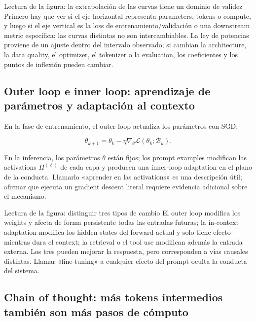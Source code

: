 \begin{warningbox}{Lectura de la figura: la extrapolación de las curvas tiene un dominio de validez}
Primero hay que ver si el eje horizontal representa parameters, tokens o compute, y luego si el eje vertical es la loss de entrenamiento/validación o una downstream metric específica; las curvas distintas no son intercambiables. La ley de potencias proviene de un ajuste dentro del intervalo observado; si cambian la architecture, la data quality, el optimizer, el tokenizer o la evaluation, los coeficientes y los puntos de inflexión pueden cambiar.
\end{warningbox}

\subsection{Outer loop e inner loop: aprendizaje de parámetros y adaptación al contexto}

En la fase de entrenamiento, el outer loop actualiza los parámetros con SGD:

\[
\theta_{k+1}=\theta_k-\eta\nabla_\theta \mathcal L(\theta_k;\mathcal B_k).
\]

En la inferencia, los parámetros $\theta$ están fijos; los prompt examples modifican las activations $H^{(\ell)}$ de cada capa y producen una inner-loop adaptation en el plano de la conducta. Llamarlo «aprender en las activations» es una descripción útil; afirmar que ejecuta un gradient descent literal requiere evidencia adicional sobre el mecanismo.


\begin{knowledgebox}{Lectura de la figura: distinguir tres tipos de cambio}
El outer loop modifica los weights y afecta de forma persistente todas las entradas futuras; la in-context adaptation modifica los hidden states del forward actual y solo tiene efecto mientras dura el context; la retrieval o el tool use modifican además la entrada externa. Los tres pueden mejorar la respuesta, pero corresponden a vías causales distintas. Llamar «fine-tuning» a cualquier efecto del prompt oculta la conducta del sistema.
\end{knowledgebox}

\subsection{Chain of thought: más tokens intermedios también son más pasos de cómputo}

